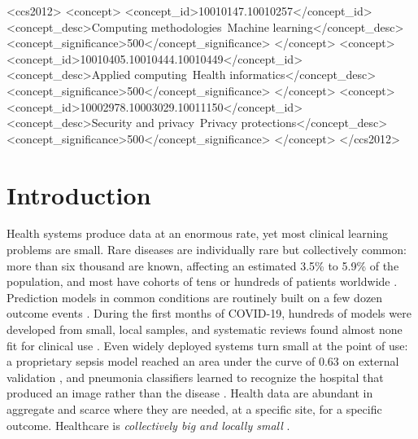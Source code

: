 \documentclass[acmsmall,screen,review]{acmart}
\theoremstyle{acmdefinition}
\begin{document}
\begin{CCSXML}
<ccs2012>
  <concept>
    <concept_id>10010147.10010257</concept_id>
    <concept_desc>Computing methodologies~Machine learning</concept_desc>
    <concept_significance>500</concept_significance>
    </concept>
  <concept>
    <concept_id>10010405.10010444.10010449</concept_id>
    <concept_desc>Applied computing~Health informatics</concept_desc>
    <concept_significance>500</concept_significance>
    </concept>
  <concept>
    <concept_id>10002978.10003029.10011150</concept_id>
    <concept_desc>Security and privacy~Privacy protections</concept_desc>
    <concept_significance>500</concept_significance>
    </concept>
 </ccs2012>
\end{CCSXML}



\maketitle
\renewcommand{\shortauthors}{Sim\~{o}es et al.}

\section{Introduction}\label{sec:intro}

Health systems produce data at an enormous rate, yet most clinical learning problems are small. Rare diseases are individually rare but collectively common: more than six thousand are known, affecting an estimated 3.5\% to 5.9\% of the population, and most have cohorts of tens or hundreds of patients worldwide \cite{nguengangwakap2020estimating,schaefer2020use}. Prediction models in common conditions are routinely built on a few dozen outcome events \cite{peduzzi1996simulation,riley2019minimumsample}. During the first months of COVID-19, hundreds of models were developed from small, local samples, and systematic reviews found almost none fit for clinical use \cite{roberts2021common,wynants2020prediction}. Even widely deployed systems turn small at the point of use: a proprietary sepsis model reached an area under the curve of 0.63 on external validation \cite{wong2021external}, and pneumonia classifiers learned to recognize the hospital that produced an image rather than the disease \cite{zech2018variable}. Health data are abundant in aggregate and scarce where they are needed, at a specific site, for a specific outcome. Healthcare is \emph{collectively big and locally small} \cite{simoes2026collectively}.
\end{document}

